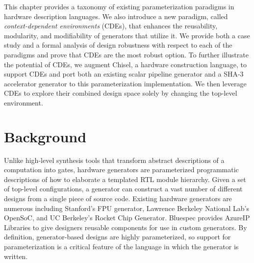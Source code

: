 
This chapter provides a taxonomy of existing parameterization paradigms in hardware description languages. 
We also introduce a new paradigm, called \emph{context-dependent environments} (CDEs), that enhances the reusability, modularity, and modifiability of generators that utilize it.
We provide both a case study and a formal analysis of design robustness with respect to each of the paradigms and prove that CDEs are the most robust option.
To further illustrate the potential of CDEs, we augment Chisel, a hardware construction language, 
to support CDEs and port both an existing scalar pipeline generator and a SHA-3 accelerator generator to this parameterization implementation. 
We then leverage CDEs to explore their combined design space solely by changing the top-level environment.



\section{Background}
\label{sec:rel}



Unlike high-level synthesis tools that transform abstract descriptions of a computation into gates, hardware generators are parameterized programmatic descriptions of how to elaborate a templated RTL module hierarchy\cite{templates}. Given a set of top-level configurations, a generator can construct a vast number of different designs from a single piece of source code. Existing hardware generators are numerous including Stanford's FPU generator\cite{fpu}, Lawrence Berkeley National Lab's OpenSoC\cite{opensoc}, and UC Berkeley's Rocket Chip Generator\cite{rocket}. Bluespec provides AzureIP Libraries\cite{azure} to give designers reusable components for use in custom generators. By definition, generator-based designs are highly parameterized, so support for parameterization is a critical feature of the language in which the generator is written.

